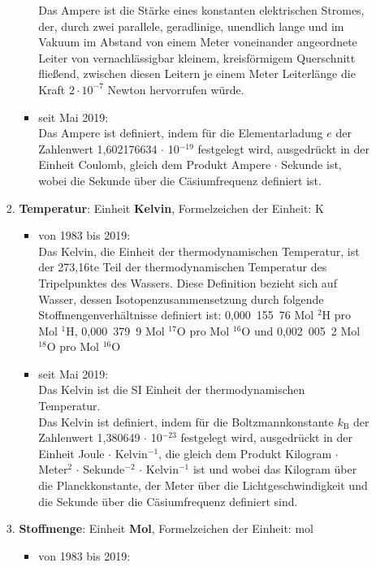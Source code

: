 \begin{raggedright}
\begin{enumerate}
\begin{itemize}
\begin{enumerate}[1.)]
\begin{itemize}
			Das Ampere ist die Stärke eines konstanten elektrischen
			Stromes, der, durch zwei parallele, geradlinige, unendlich lange
			und im Vakuum im Abstand von einem Meter voneinander
			angeordnete Leiter von vernachlässigbar kleinem, kreisförmigem
			Querschnitt fließend, zwischen diesen Leitern je einem Meter
			Leiterlänge die Kraft $2 \cdot 10^{-7}$ Newton hervorrufen würde.
			\item seit Mai 2019:\\
      Das Ampere ist definiert, indem für die Elementarladung
      $e$ der Zahlenwert 1,602176634 $\cdot$ 10$^{-19}$ festgelegt wird,
      ausgedrückt in der Einheit Coulomb, gleich dem
      Produkt Ampere $\cdot$ Sekunde ist,
      wobei die Sekunde über die Cäsiumfrequenz definiert ist.
			\end{itemize}
		\item \textbf{Temperatur}: Einheit \textbf{Kelvin}, Formelzeichen der Einheit: K
			\begin{itemize}
			\item von 1983 bis 2019:\\
			Das Kelvin, die Einheit der thermodynamischen Temperatur,
			ist der 273,16te Teil der thermodynamischen Temperatur des
			Tripelpunktes des Wassers. Diese Definition bezieht sich auf
			Wasser, dessen Isotopenzusammensetzung durch folgende
			Stoffmengenverhältnisse definiert ist: 0,000~155~76 Mol $^2\mathrm{H}$ pro
			Mol $^1\mathrm{H}$, 0,000~379~9 Mol $^{17}\mathrm{O}$ pro Mol $^{16}\mathrm{O}$
			und 0,002~005~2 Mol $^{18}\mathrm{O}$ pro Mol $^{16}\mathrm{O}$
			\item seit Mai 2019:\\
      Das Kelvin ist die SI Einheit der thermodynamischen Temperatur.\\
      Das Kelvin ist definiert, indem für die Boltzmannkonstante $k_\mathrm{B}$
      der Zahlenwert 1,380649 $\cdot$ 10$^{-23}$ festgelegt wird, ausgedrückt in der
      Einheit Joule $\cdot$ Kelvin$^{-1}$, die gleich dem Produkt
      Kilogram $\cdot$ Meter$^2$ $\cdot$ Sekunde$^{-2}$ $\cdot$ Kelvin$^{-1}$ ist und
      wobei das Kilogram über die Planckkonstante, der Meter über die
      Lichtgeschwindigkeit und die Sekunde über die Cäsiumfrequenz definiert sind.
			\end{itemize}
		\item \textbf{Stoffmenge}: Einheit \textbf{Mol}, Formelzeichen der Einheit: mol
			\begin{itemize}
			\item von 1983 bis 2019:\\

\end{itemize}
\end{enumerate}
\end{itemize}
\end{enumerate}
\end{raggedright}
